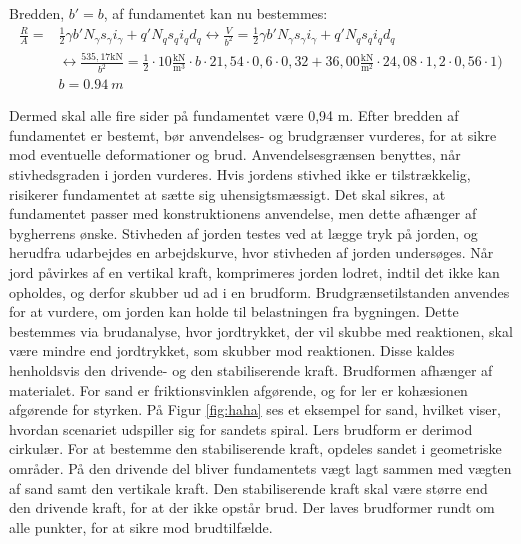 Bredden, $b'=b$, af fundamentet kan nu bestemmes: 
\begin{equation}
\begin{split}
	\frac{R}{A} = & \frac{1}{2} \gamma b' N_\gamma s_\gamma i_\gamma + q' N_q s_q i_q d_q \leftrightarrow \frac{V}{b^2} = \frac{1}{2} \gamma b' N_\gamma s_\gamma i_\gamma + q' N_q s_q i_q d_q \\ & \leftrightarrow \frac{535,\!17 \text{kN}}{b^2} = \frac{1}{2}\cdot 10 \frac{\text{kN}}{\text{m}^3}\cdot b\cdot 21,\!54\cdot 0,\!6 \cdot 0,\!32 + 36,\!00 \frac{\text{kN}}{\text{m}^2}\cdot 24,\!08 \cdot 1,\!2 \cdot 0,\!56 \cdot 1) \\ & b = \SI{0,94}{m}
\end{split}
\end{equation}

Dermed skal alle fire sider på fundamentet være 0,94 m.
\newline
\newline
Efter bredden af fundamentet er bestemt, bør anvendelses- og brudgrænser vurderes, for at sikre mod eventuelle deformationer og brud. Anvendelsesgrænsen benyttes, når stivhedsgraden i jorden vurderes. Hvis jordens stivhed ikke er tilstrækkelig, risikerer fundamentet at sætte sig uhensigtsmæssigt. Det skal sikres, at fundamentet passer med konstruktionens anvendelse, men dette afhænger af bygherrens ønske. 
\newline \indent{     }  Stivheden af jorden testes ved at lægge tryk på jorden, og herudfra udarbejdes en arbejdskurve, hvor stivheden af jorden undersøges.   
\newline \indent{     }  Når jord påvirkes af en vertikal kraft, komprimeres jorden lodret, indtil det ikke kan opholdes, og derfor skubber ud ad i en brudform. Brudgrænsetilstanden anvendes for at vurdere, om jorden kan holde til belastningen fra bygningen. Dette bestemmes via brudanalyse, hvor jordtrykket, der vil skubbe med reaktionen, skal være mindre end jordtrykket, som skubber mod reaktionen. Disse kaldes henholdsvis den drivende- og den stabiliserende kraft. Brudformen afhænger af materialet. For sand er friktionsvinklen afgørende, og for ler er kohæsionen afgørende for styrken.
\newline \indent{     }  På Figur \ref{fig:haha} ses et eksempel for sand, hvilket viser, hvordan scenariet udspiller sig for sandets spiral. Lers brudform er derimod cirkulær. For at bestemme den stabiliserende kraft, opdeles sandet i geometriske områder. På den drivende del bliver fundamentets vægt lagt sammen med vægten af sand samt den vertikale kraft. Den stabiliserende kraft skal være større end den drivende kraft, for at der ikke opstår brud. Der laves brudformer rundt om alle punkter, for at sikre mod brudtilfælde. 

